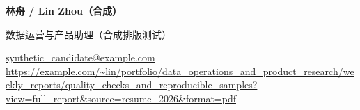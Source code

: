 \documentclass[11pt,a4paper,fontset=fandol]{ctexart}
\begin{document}
{\LARGE\bfseries 林舟 / Lin Zhou（合成）}\par
数据运营与产品助理（合成排版测试）\par
\href{mailto:synthetic\_candidate@example.com}{s\allowbreak{}y\allowbreak{}n\allowbreak{}t\allowbreak{}h\allowbreak{}e\allowbreak{}t\allowbreak{}i\allowbreak{}c\allowbreak{}\_\allowbreak{}c\allowbreak{}a\allowbreak{}n\allowbreak{}d\allowbreak{}i\allowbreak{}d\allowbreak{}a\allowbreak{}t\allowbreak{}e\allowbreak{}@\allowbreak{}e\allowbreak{}x\allowbreak{}a\allowbreak{}m\allowbreak{}p\allowbreak{}l\allowbreak{}e\allowbreak{}.\allowbreak{}c\allowbreak{}o\allowbreak{}m} \textbar{} \allowbreak{}\href{https://example.com/\%7Elin/portfolio/data\_operations\_and\_product\_research/weekly\_reports/quality\_checks\_and\_reproducible\_samples?view=full\_report\&source=resume\_2026\&format=pdf}{h\allowbreak{}t\allowbreak{}t\allowbreak{}p\allowbreak{}s\allowbreak{}:\allowbreak{}/\allowbreak{}/\allowbreak{}e\allowbreak{}x\allowbreak{}a\allowbreak{}m\allowbreak{}p\allowbreak{}l\allowbreak{}e\allowbreak{}.\allowbreak{}c\allowbreak{}o\allowbreak{}m\allowbreak{}/\allowbreak{}\textasciitilde{}\allowbreak{}l\allowbreak{}i\allowbreak{}n\allowbreak{}/\allowbreak{}p\allowbreak{}o\allowbreak{}r\allowbreak{}t\allowbreak{}f\allowbreak{}o\allowbreak{}l\allowbreak{}i\allowbreak{}o\allowbreak{}/\allowbreak{}d\allowbreak{}a\allowbreak{}t\allowbreak{}a\allowbreak{}\_\allowbreak{}o\allowbreak{}p\allowbreak{}e\allowbreak{}r\allowbreak{}a\allowbreak{}t\allowbreak{}i\allowbreak{}o\allowbreak{}n\allowbreak{}s\allowbreak{}\_\allowbreak{}a\allowbreak{}n\allowbreak{}d\allowbreak{}\_\allowbreak{}p\allowbreak{}r\allowbreak{}o\allowbreak{}d\allowbreak{}u\allowbreak{}c\allowbreak{}t\allowbreak{}\_\allowbreak{}r\allowbreak{}e\allowbreak{}s\allowbreak{}e\allowbreak{}a\allowbreak{}r\allowbreak{}c\allowbreak{}h\allowbreak{}/\allowbreak{}w\allowbreak{}e\allowbreak{}e\allowbreak{}k\allowbreak{}l\allowbreak{}y\allowbreak{}\_\allowbreak{}r\allowbreak{}e\allowbreak{}p\allowbreak{}o\allowbreak{}r\allowbreak{}t\allowbreak{}s\allowbreak{}/\allowbreak{}q\allowbreak{}u\allowbreak{}a\allowbreak{}l\allowbreak{}i\allowbreak{}t\allowbreak{}y\allowbreak{}\_\allowbreak{}c\allowbreak{}h\allowbreak{}e\allowbreak{}c\allowbreak{}k\allowbreak{}s\allowbreak{}\_\allowbreak{}a\allowbreak{}n\allowbreak{}d\allowbreak{}\_\allowbreak{}r\allowbreak{}e\allowbreak{}p\allowbreak{}r\allowbreak{}o\allowbreak{}d\allowbreak{}u\allowbreak{}c\allowbreak{}i\allowbreak{}b\allowbreak{}l\allowbreak{}e\allowbreak{}\_\allowbreak{}s\allowbreak{}a\allowbreak{}m\allowbreak{}p\allowbreak{}l\allowbreak{}e\allowbreak{}s\allowbreak{}?\allowbreak{}v\allowbreak{}i\allowbreak{}e\allowbreak{}w\allowbreak{}=\allowbreak{}f\allowbreak{}u\allowbreak{}l\allowbreak{}l\allowbreak{}\_\allowbreak{}r\allowbreak{}e\allowbreak{}p\allowbreak{}o\allowbreak{}r\allowbreak{}t\allowbreak{}\&\allowbreak{}s\allowbreak{}o\allowbreak{}u\allowbreak{}r\allowbreak{}c\allowbreak{}e\allowbreak{}=\allowbreak{}r\allowbreak{}e\allowbreak{}s\allowbreak{}u\allowbreak{}m\allowbreak{}e\allowbreak{}\_\allowbreak{}2\allowbreak{}0\allowbreak{}2\allowbreak{}6\allowbreak{}\&\allowbreak{}f\allowbreak{}o\allowbreak{}r\allowbreak{}m\allowbreak{}a\allowbreak{}t\allowbreak{}=\allowbreak{}p\allowbreak{}d\allowbreak{}f} \textbar{} 
\end{document}
